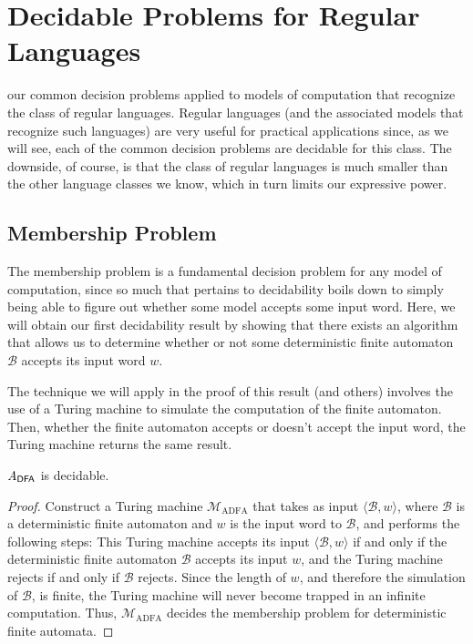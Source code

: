 \section{Decidable Problems for Regular Languages}\label{sec:decidableREG}

 our common decision problems applied to models of computation that recognize the class of regular languages. Regular languages (and the associated models that recognize such languages) are very useful for practical applications since, as we will see, each of the common decision problems are decidable for this class. The downside, of course, is that the class of regular languages is much smaller than the other language classes we know, which in turn limits our expressive power.

\subsection*{Membership Problem}

The membership problem is a fundamental decision problem for any model of computation, since so much that pertains to decidability boils down to simply being able to figure out whether some model accepts some input word. Here, we will obtain our first decidability result by showing that there exists an algorithm that allows us to determine whether or not some deterministic finite automaton $\mathcal{B}$ accepts its input word $w$.

The technique we will apply in the proof of this result (and others) involves the use of a Turing machine to simulate the computation of the finite automaton. Then, whether the finite automaton accepts or doesn't accept the input word, the Turing machine returns the same result.

\begin{theorem}\label{thm:ADFAdecidable}
$\mathit{A}_{\textsf{DFA}}$ is decidable.

\begin{proof}
Construct a Turing machine $\mathcal{M}_{\mathrm{ADFA}}$ that takes as input $\langle \mathcal{B}, w \rangle$, where $\mathcal{B}$ is a deterministic finite automaton and $w$ is the input word to $\mathcal{B}$, and performs the following steps:
This Turing machine accepts its input $\langle \mathcal{B}, w \rangle$ if and only if the deterministic finite automaton $\mathcal{B}$ accepts its input $w$, and the Turing machine rejects if and only if $\mathcal{B}$ rejects. Since the length of $w$, and therefore the simulation of $\mathcal{B}$, is finite, the Turing machine will never become trapped in an infinite computation. Thus, $\mathcal{M}_{\mathrm{ADFA}}$ decides the membership problem for deterministic finite automata.
\end{proof}
\end{theorem}


